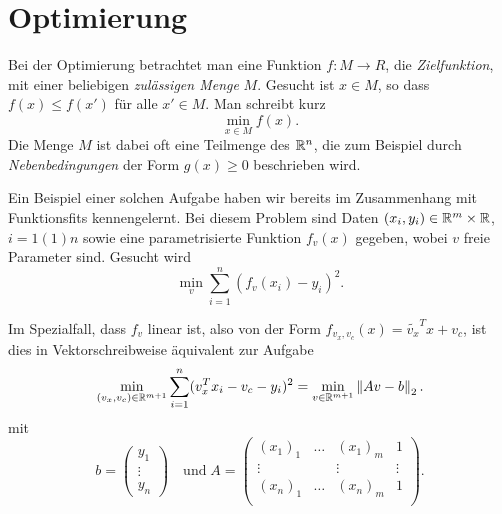 % 

\chapter{Optimierung}

Bei der Optimierung betrachtet man eine Funktion $f:M\to R$, die
\emph{Zielfunktion}, mit einer beliebigen \emph{zulässigen Menge} $M$.
Gesucht ist $x\in M$, so dass $f(x) \le f(x')$ für alle $x'\in M$. Man
schreibt kurz
\begin{equation}
  \label{eq:min}
  \min_{x\in M} f(x).
\end{equation}
Die Menge $M$ ist dabei oft eine Teilmenge des $\mathbb{R}^n$, die zum
Beispiel durch \emph{Nebenbedingungen} der Form $g(x)\ge 0$
beschrieben wird.

Ein Beispiel einer solchen Aufgabe haben wir bereits im Zusammenhang
mit Funktionsfits kennengelernt. Bei diesem Problem sind Daten $(x_i,
y_i)\in\mathbb{R}^m\times\mathbb{R}$, $i=1(1)n$ sowie eine parametrisierte Funktion
$f_v(x)$ gegeben, wobei $v$ freie Parameter sind. Gesucht
wird
\begin{equation}
  \label{eq:fit}
  \min_{v} \sum_{i=1}^n (f_v(x_i) - y_i)^2.
\end{equation}

Im Spezialfall, dass $f_v$ linear ist, also von der Form
$f_{v_x,v_c}(x) = \tilde{v_x}^Tx + v_c$, ist dies in
Vektorschreibweise äquivalent zur Aufgabe
\begin{equation}
  \label{eq:min2}
  \min_{(v_x,v_c)\in\mathbb{R}^{m+1}} \sum_{i=1}^n (v_x^T x_i -
  v_c - y_i)^2 = \min_{v\in\mathbb{R}^{m+1}} \left\lVert{A v - b}\right\rVert_2.
\end{equation}
mit
\begin{equation*}
  b =
  \begin{pmatrix}
    y_1\\
    \vdots\\
    y_n
  \end{pmatrix}
\quad\text{und}\;
A =
\begin{pmatrix}
  (x_1)_1 & \ldots & (x_1)_m & 1\\
  \vdots &        & \vdots & \vdots\\
  (x_n)_1 & \ldots & (x_n)_m & 1\\
\end{pmatrix}.
\end{equation*}

